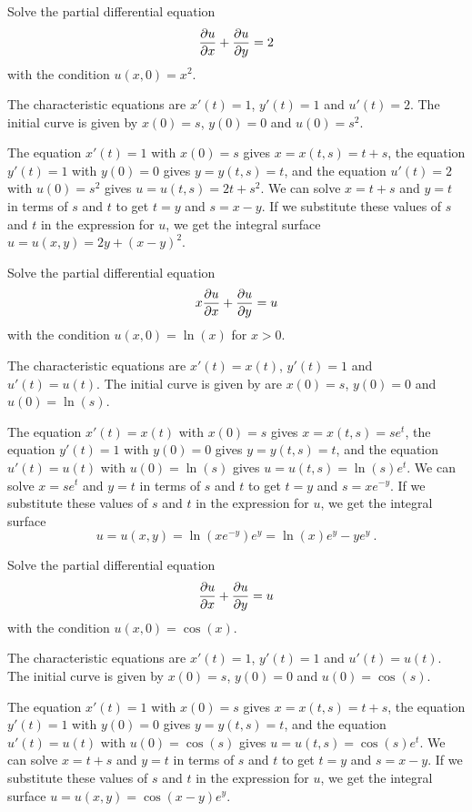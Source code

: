 \begin{egg}
Solve the partial differential equation
\[
\frac{\partial{u}}{\partial x} + \frac{\partial{u}}{\partial y} = 2
\]
with the condition $\displaystyle u(x,0)=x^2$.

The characteristic equations are $x'(t) = 1$, $y'(t) = 1$ and $u'(t) = 2$.
The initial curve is given by $x(0) = s$, $y(0) = 0$ and $u(0) = s^2$.

The equation $x'(t) = 1$ with $x(0)=s$ gives $x = x(t,s) = t + s$,
the equation $y'(t) = 1$ with $y(0)=0$ gives $y = y(t,s) = t$, and
the equation $u'(t) = 2$ with $\displaystyle u(0)=s^2$ gives
$\displaystyle u = u(t,s) = 2t+s^2$.
We can solve $x = t+s$ and $y=t$ in terms of $s$ and $t$ to get
$t=y$ and $s= x-y$.  If we substitute these values of $s$ and $t$ in the
expression for $u$, we get the integral surface
$\displaystyle u= u(x,y) = 2y + (x-y)^2$.
\end{egg}

\begin{egg}
Solve the partial differential equation
\[
x \frac{\partial{u}}{\partial x} + \frac{\partial{u}}{\partial y} = u
\]
with the condition $u(x,0)=\ln(x)$ for $x>0$.

The characteristic equations are $x'(t) = x(t)$, $y'(t) = 1$ and
$u'(t) = u(t)$.  The initial curve is given by are
$x(0) = s$, $y(0) = 0$ and $u(0) = \ln(s)$.

The equation $x'(t) = x(t)$ with $x(0)=s$ gives
$\displaystyle x = x(t,s) = s e^t$,
the equation $y'(t) = 1$ with $y(0)=0$ gives $y = y(t,s) = t$, and
the equation $u'(t) = u(t)$ with $u(0)=\ln(s)$ gives
$\displaystyle u = u(t,s) = \ln(s)e^t$.
We can solve $\displaystyle x = se^t$ and $y=t$ in terms of $s$ and $t$ to get
$t=y$ and $\displaystyle s= xe^{-y}$.  If we substitute these values
of $s$ and $t$ in the expression for $u$, we get the integral surface
\[
u= u(x,y) = \ln(xe^{-y}) e^y = \ln(x) e^y -y e^y \ .
\]
\end{egg}

\begin{egg}
Solve the partial differential equation
\[
\frac{\partial{u}}{\partial x} + \frac{\partial{u}}{\partial y} = u
\]
with the condition $u(x,0)=\cos(x)$.

The characteristic equations are $x'(t) = 1$, $y'(t) = 1$ and $u'(t) = u(t)$.
The initial curve is given by $x(0) = s$, $y(0) = 0$ and $u(0) = \cos(s)$.

The equation $x'(t) = 1$ with $x(0)=s$ gives $x = x(t,s) = t + s$,
the equation $y'(t) = 1$ with $y(0)=0$ gives $y = y(t,s) = t$, and
the equation $u'(t) = u(t)$ with $u(0)=\cos(s)$ gives
$\displaystyle u = u(t,s) = \cos(s)e^t$.
We can solve $x = t+s$ and $y=t$ in terms of $s$ and $t$ to get
$t=y$ and $s= x-y$.  If we substitute these values of $s$ and $t$ in the
expression for $u$, we get the integral surface
$\displaystyle u= u(x,y) = \cos(x-y) e^y$.
\end{egg}

